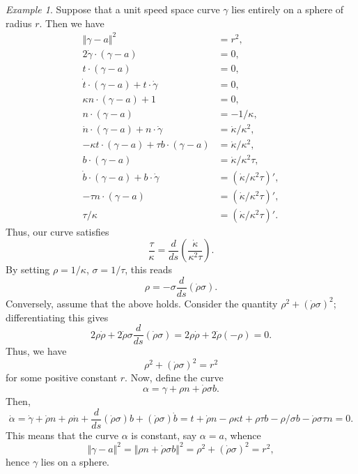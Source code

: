 \documentclass[11pt]{article}
\newcommand{\norm}[1]{\Vert #1 \Vert}
\newcommand{\dd}[2]{\frac{d #1}{d #2}}
\theoremstyle{definition}
\theoremstyle{remark}
\newtheorem*{example}{Example}
\numberwithin{equation}{section}
\begin{document}
    \begin{example}
        Suppose that a unit speed space curve $\gamma$ lies entirely on a sphere of
        radius $r$. Then we have \begin{align*}
            \norm{\gamma - a}^2 &= r^2, \\
            2\dot{\gamma}\cdot (\gamma - a) &= 0, \\
            t\cdot (\gamma - a) &= 0, \\
            \dot{t}\cdot (\gamma - a) + t\cdot\dot{\gamma} &= 0, \\
            \kappa n\cdot(\gamma - a) + 1 &= 0, \\
            n\cdot(\gamma - a) &= -1 / \kappa, \\
            \dot{n}\cdot(\gamma - a) + n\cdot\dot{\gamma} &= \dot{\kappa}/\kappa^2,
            \\
            -\kappa t\cdot(\gamma - a) + \tau b\cdot(\gamma - a) &=
            \dot{\kappa}/\kappa^2, \\
            b\cdot(\gamma - a) &= \dot{\kappa}/\kappa^2\tau, \\
            \dot{b}\cdot(\gamma - a) + b\cdot\dot{\gamma} &=
            (\dot{\kappa}/\kappa^2\tau)', \\
            -\tau n\cdot(\gamma - a) &= (\dot{\kappa}/\kappa^2\tau)', \\
            \tau / \kappa &= (\dot{\kappa}/\kappa^2\tau)'.
        \end{align*}
        Thus, our curve satisfies \[
            \frac{\tau}{\kappa} =
            \dd{}{s}\left(\frac{\dot{\kappa}}{\kappa^2\tau}\right).
        \] By setting $\rho = 1 / \kappa$, $\sigma = 1 / \tau$, this reads \[
            \rho = -\sigma \dd{}{s}(\dot{\rho}\sigma).
        \] Conversely, assume that the above holds. Consider the quantity $\rho^2 +
        (\dot{\rho}\sigma)^2$; differentiating this gives \[
            2\rho \dot{\rho} + 2\dot{\rho}\sigma\dd{}{s}(\dot{\rho}\sigma) =
            2\rho\dot{\rho} + 2\dot{\rho}(-\rho) = 0.
        \] Thus, we have \[
            \rho^2 + (\dot{\rho}\sigma)^2 = r^2
        \] for some positive constant $r$. Now, define the curve \[
            \alpha = \gamma + \rho n + \dot{\rho}\sigma b.
        \] Then, \[
            \dot{\alpha} = \dot{\gamma} + \dot{\rho}n + \rho\dot{n} +
            \dd{}{s}(\dot{\rho}\sigma)b + (\dot{\rho}\sigma)\dot{b} = t + \dot{\rho}n
            - \rho\kappa t + \rho\tau b - \rho / \sigma b - \dot{\rho}\sigma \tau n =
            0.
        \] This means that the curve $\alpha$ is constant, say $\alpha = a$, whence
        \[
            \norm{\gamma - a}^2 = \norm{\rho n + \dot{\rho}\sigma b}^2 = \rho^2 +
            (\dot{\rho}\sigma)^2 = r^2,
        \] hence $\gamma$ lies on a sphere.
    \end{example}
\end{document}

